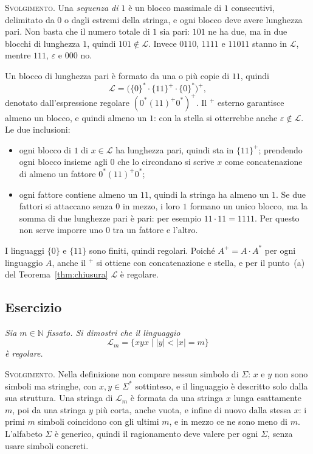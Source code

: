 \documentclass[a4paper, 11pt, oneside]{book}
\makeatletter
\theoremstyle{formale}
\newcommand{\spaziominimo}[1]{%
    \par
    \if@nobreak\else
        \ifdim\pagegoal<\maxdimen
            \ifdim\dimexpr\pagegoal-\pagetotal\relax<#1\relax
                \ifdim\pagetotal>\pagegoal\else
                    \newpage
                \fi
            \fi
        \fi
    \fi}
\newcounter{escount}[section]
\newcommand{\esercizio}{
    \spaziominimo{8\baselineskip}%
    \refstepcounter{escount}%
    \subsection*{Esercizio \arabic{escount}}%
}
\makeatother
\begin{document}
    \textsc{Svolgimento}. Una \emph{sequenza di $1$} \`e un blocco massimale di $1$
    consecutivi, delimitato da $0$ o dagli estremi della stringa, e ogni blocco deve
    avere lunghezza pari. Non basta che il numero totale di $1$ sia pari: $101$ ne ha due,
    ma in due blocchi di lunghezza $1$, quindi $101 \notin \mathcal{L}$. Invece $0110$,
    $1111$ e $11011$ stanno in $\mathcal{L}$, mentre $111$, $\varepsilon$ e $000$ no.

    Un blocco di lunghezza pari \`e formato da una o pi\`u copie di $11$, quindi
    \begin{equation*}
        \mathcal{L} = \bigl(\{0\}^* \cdot \{11\}^+ \cdot \{0\}^*\bigr)^+,
    \end{equation*}
    denotato dall'espressione regolare $(0^*(11)^+0^*)^+$. Il $^+$ esterno garantisce
    almeno un blocco, e quindi almeno un $1$: con la stella si otterrebbe anche
    $\varepsilon \notin \mathcal{L}$. Le due inclusioni:
    \begin{itemize}
        \item[($\subseteq$)] ogni blocco di $1$ di $x \in \mathcal{L}$ ha lunghezza pari,
            quindi sta in $\{11\}^+$; prendendo ogni blocco insieme agli $0$ che lo
            circondano si scrive $x$ come concatenazione di almeno un fattore
            $0^* (11)^+ 0^*$;
        \item[($\supseteq$)] ogni fattore contiene almeno un $11$, quindi la stringa ha
            almeno un $1$. Se due fattori si attaccano senza $0$ in mezzo, i loro $1$
            formano un unico blocco, ma la somma di due lunghezze pari \`e pari: per
            esempio $11 \cdot 11 = 1111$. Per questo non serve imporre uno $0$ tra un
            fattore e l'altro.
    \end{itemize}
    I linguaggi $\{0\}$ e $\{11\}$ sono finiti, quindi regolari. Poich\'e
    $A^+ = A \cdot A^*$ per ogni linguaggio $A$, anche il $^+$ si ottiene con
    concatenazione e stella, e per il punto~(a) del Teorema~\ref{thm:chiusura}
    $\mathcal{L}$ \`e regolare.

    \esercizio
    \textit{Sia $m \in \mathbb{N}$ fissato. Si dimostri che il linguaggio
    \begin{equation*}
        \mathcal{L}_m = \{xyx \mid |y| < |x| = m\}
    \end{equation*}
    \`e regolare.}

    \textsc{Svolgimento}. Nella definizione non compare nessun simbolo di $\Sigma$: $x$ e
    $y$ non sono simboli ma stringhe, con $x, y \in \Sigma^*$ sottinteso, e il linguaggio
    \`e descritto solo dalla sua struttura. Una stringa di $\mathcal{L}_m$ \`e formata da
    una stringa $x$ lunga esattamente $m$, poi da una stringa $y$ pi\`u corta, anche
    vuota, e infine di nuovo dalla stessa $x$: i primi $m$ simboli coincidono con gli
    ultimi $m$, e in mezzo ce ne sono meno di $m$. L'alfabeto $\Sigma$ \`e generico, quindi
    il ragionamento deve valere per ogni $\Sigma$, senza usare simboli concreti.
\end{document}
